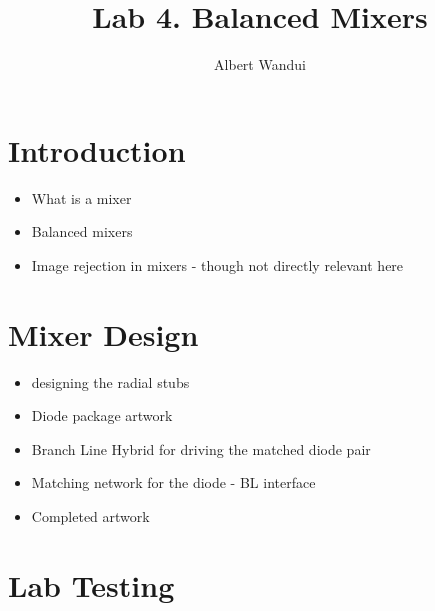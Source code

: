 \documentclass[twocolumn, aps, floatfix]{revtex4-1}
\begin{document}
\title{Lab 4. Balanced Mixers }
\author{Albert Wandui}
\maketitle

\section*{Introduction}\label{sec:introduction}

\begin{itemize}
    \item What is a mixer

    \item Balanced mixers

    \item Image rejection in mixers - though not directly relevant here

\end{itemize}

\section*{Mixer Design}\label{sec:design}

\begin{itemize}
    \item designing the radial stubs

    \item Diode package artwork

    \item Branch Line Hybrid for driving the matched diode pair

    \item Matching network for the diode - BL interface

    \item Completed artwork
    
\end{itemize}

\FloatBarrier

\section*{Lab Testing}
\end{document}

